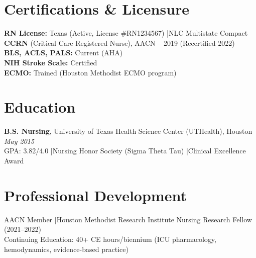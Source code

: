 \documentclass[11pt,a4paper]{article}
\begin{document}
\section{Certifications \& Licensure}
\textbf{RN License:} Texas (Active, License \#RN1234567) \quad|\quad NLC Multistate Compact\\
\textbf{CCRN} (Critical Care Registered Nurse), AACN -- 2019 (Recertified 2022)\\
\textbf{BLS, ACLS, PALS:} Current (AHA)\\
\textbf{NIH Stroke Scale:} Certified\\
\textbf{ECMO:} Trained (Houston Methodist ECMO program)

\section{Education}
\textbf{B.S. Nursing}, University of Texas Health Science Center (UTHealth), Houston \hfill \textit{May 2015}\\
GPA: 3.82/4.0 \quad|\quad Nursing Honor Society (Sigma Theta Tau) \quad|\quad Clinical Excellence Award

\section{Professional Development}
AACN Member \quad|\quad Houston Methodist Research Institute Nursing Research Fellow (2021--2022)\\
Continuing Education: 40+ CE hours/biennium (ICU pharmacology, hemodynamics, evidence-based practice)
\end{document}
